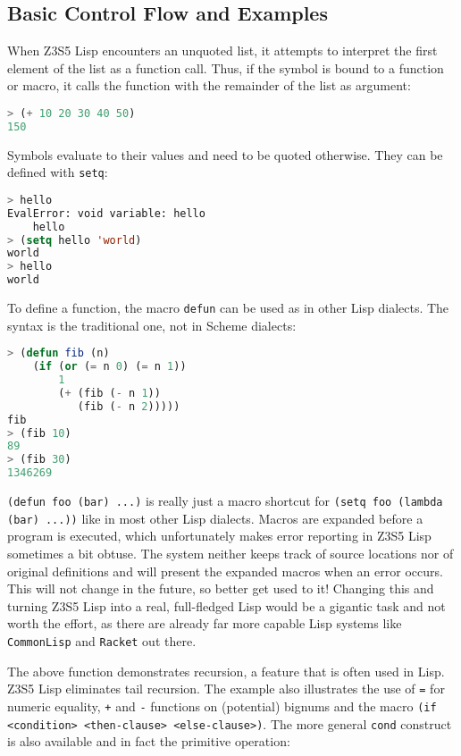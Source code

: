 \documentclass[
]{article}
\newcommand{\passthrough}[1]{#1}
\begin{document}
\hypertarget{basic-control-flow-and-examples}{%
\subsection{Basic Control Flow and
Examples}\label{basic-control-flow-and-examples}}

When Z3S5 Lisp encounters an unquoted list, it attempts to interpret the
first element of the list as a function call. Thus, if the symbol is
bound to a function or macro, it calls the function with the remainder
of the list as argument:

\begin{lstlisting}[language=Lisp]
> (+ 10 20 30 40 50)
150
\end{lstlisting}

Symbols evaluate to their values and need to be quoted otherwise. They
can be defined with \passthrough{\lstinline!setq!}:

\begin{lstlisting}[language=Lisp]
> hello
EvalError: void variable: hello
    hello
> (setq hello 'world)
world
> hello
world
\end{lstlisting}

To define a function, the macro \passthrough{\lstinline!defun!} can be
used as in other Lisp dialects. The syntax is the traditional one, not
in Scheme dialects:

\begin{lstlisting}[language=Lisp]
> (defun fib (n)
    (if (or (= n 0) (= n 1))
        1
        (+ (fib (- n 1))
           (fib (- n 2)))))
fib
> (fib 10)
89
> (fib 30)
1346269
\end{lstlisting}

\passthrough{\lstinline!(defun foo (bar) ...)!} is really just a macro
shortcut for \passthrough{\lstinline!(setq foo (lambda (bar) ...))!}
like in most other Lisp dialects. Macros are expanded before a program
is executed, which unfortunately makes error reporting in Z3S5 Lisp
sometimes a bit obtuse. The system neither keeps track of source
locations nor of original definitions and will present the expanded
macros when an error occurs. This will not change in the future, so
better get used to it! Changing this and turning Z3S5 Lisp into a real,
full-fledged Lisp would be a gigantic task and not worth the effort, as
there are already far more capable Lisp systems like
\passthrough{\lstinline!CommonLisp!} and
\passthrough{\lstinline!Racket!} out there.

The above function demonstrates recursion, a feature that is often used
in Lisp. Z3S5 Lisp eliminates tail recursion. The example also
illustrates the use of \passthrough{\lstinline!=!} for numeric equality,
\passthrough{\lstinline!+!} and \passthrough{\lstinline!-!} functions on
(potential) bignums and the macro
\passthrough{\lstinline!(if <condition> <then-clause> <else-clause>)!}.
The more general \passthrough{\lstinline!cond!} construct is also
available and in fact the primitive operation:
\end{document}
